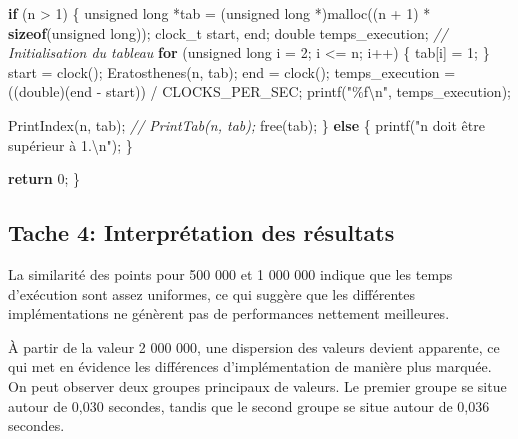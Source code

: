 \documentclass[
]{article}
\newenvironment{Shaded}{}{}
\newcommand{\CommentTok}[1]{\textcolor[rgb]{0.38,0.63,0.69}{\textit{#1}}}
\newcommand{\ControlFlowTok}[1]{\textcolor[rgb]{0.00,0.44,0.13}{\textbf{#1}}}
\newcommand{\DataTypeTok}[1]{\textcolor[rgb]{0.56,0.13,0.00}{#1}}
\newcommand{\DecValTok}[1]{\textcolor[rgb]{0.25,0.63,0.44}{#1}}
\newcommand{\KeywordTok}[1]{\textcolor[rgb]{0.00,0.44,0.13}{\textbf{#1}}}
\newcommand{\NormalTok}[1]{#1}
\newcommand{\SpecialCharTok}[1]{\textcolor[rgb]{0.25,0.44,0.63}{#1}}
\newcommand{\StringTok}[1]{\textcolor[rgb]{0.25,0.44,0.63}{#1}}
\begin{document}
\begin{Shaded}
\begin{Highlighting}[]
    \ControlFlowTok{if}\NormalTok{ (n \textgreater{} }\DecValTok{1}\NormalTok{)}
\NormalTok{    \{}
        \DataTypeTok{unsigned} \DataTypeTok{long}\NormalTok{ *tab = (}\DataTypeTok{unsigned} \DataTypeTok{long}\NormalTok{ *)malloc((n + }\DecValTok{1}\NormalTok{) * }\KeywordTok{sizeof}\NormalTok{(}\DataTypeTok{unsigned} \DataTypeTok{long}\NormalTok{));}
\NormalTok{        clock\_t start, end;}
        \DataTypeTok{double}\NormalTok{ temps\_execution;}
        \CommentTok{// Initialisation du tableau}
        \ControlFlowTok{for}\NormalTok{ (}\DataTypeTok{unsigned} \DataTypeTok{long}\NormalTok{ i = }\DecValTok{2}\NormalTok{; i \textless{}= n; i++)}
\NormalTok{        \{}
\NormalTok{            tab[i] = }\DecValTok{1}\NormalTok{;}
\NormalTok{        \}}
\NormalTok{        start = clock();}
\NormalTok{        Eratosthenes(n, tab);}
\NormalTok{        end = clock();}
\NormalTok{        temps\_execution = ((}\DataTypeTok{double}\NormalTok{)(end {-} start)) / CLOCKS\_PER\_SEC;}
\NormalTok{        printf(}\StringTok{"\%f}\SpecialCharTok{\textbackslash{}n}\StringTok{"}\NormalTok{, temps\_execution);}

\NormalTok{        PrintIndex(n, tab);}
        \CommentTok{// PrintTab(n, tab);}
\NormalTok{        free(tab);}
\NormalTok{    \}}
    \ControlFlowTok{else}
\NormalTok{    \{}
\NormalTok{        printf(}\StringTok{"n doit être supérieur à 1.}\SpecialCharTok{\textbackslash{}n}\StringTok{"}\NormalTok{);}
\NormalTok{    \}}

    \ControlFlowTok{return} \DecValTok{0}\NormalTok{;}
\NormalTok{\}}
\end{Highlighting}
\end{Shaded}

\pagebreak

\hypertarget{tache-4-interpruxe9tation-des-ruxe9sultats}{%
\subsection{Tache 4: Interprétation des
résultats}\label{tache-4-interpruxe9tation-des-ruxe9sultats}}

La similarité des points pour 500 000 et 1 000 000 indique que les temps
d'exécution sont assez uniformes, ce qui suggère que les différentes
implémentations ne génèrent pas de performances nettement meilleures.

À partir de la valeur 2 000 000, une dispersion des valeurs devient
apparente, ce qui met en évidence les différences d'implémentation de
manière plus marquée. On peut observer deux groupes principaux de
valeurs. Le premier groupe se situe autour de 0,030 secondes, tandis que
le second groupe se situe autour de 0,036 secondes.
\end{document}
